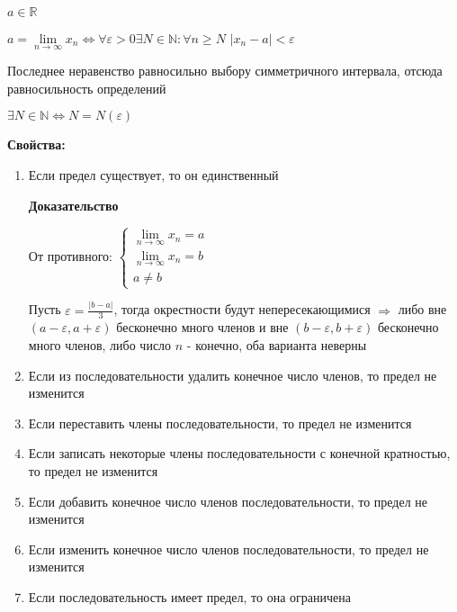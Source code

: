 \documentclass[14pt, letter paper]{article}
\begin{document}
$a \in \mathds{R}$

$a = \lim\limits_{n \rightarrow \infty}{x_n} \Leftrightarrow \forall \varepsilon > 0 \exists N \in \mathds{N}: \forall n \geq N$ $|x_n - a| < \varepsilon$

Последнее неравенство равносильно выбору симметричного интервала, отсюда равносильность определений

$\exists N \in \mathds{N} \Leftrightarrow N = N(\varepsilon)$

\textbf{Свойства:}

\begin{enumerate}
    \item Если предел существует, то он единственный

    \begin{center}
        \textbf{Доказательство}
    \end{center}

    От противного: $\begin{cases}
        \lim\limits_{n \rightarrow \infty}{x_n} = a \\
        \lim\limits_{n \rightarrow \infty}{x_n} = b \\
        a \neq b
    \end{cases}$

    Пусть $\varepsilon = \frac{|b-a|}{3}$, тогда окрестности будут непересекающимися $\Rightarrow$ либо вне $(a - \varepsilon, a + \varepsilon)$ бесконечно много членов и вне $(b - \varepsilon, b + \varepsilon)$ бесконечно много членов, либо число $n$ - конечно, оба варианта неверны

    \item Если из последовательности удалить конечное число членов, то предел не изменится

    \item Если переставить члены последовательности, то предел не изменится

    \item Если записать некоторые члены последовательности с конечной кратностью, то предел не изменится

    \item Если добавить конечное число членов последовательности, то предел не изменится

    \item Если изменить конечное число членов последовательности, то предел не изменится

    \item Если последовательность имеет предел, то она ограничена


\end{enumerate}
\end{document}
